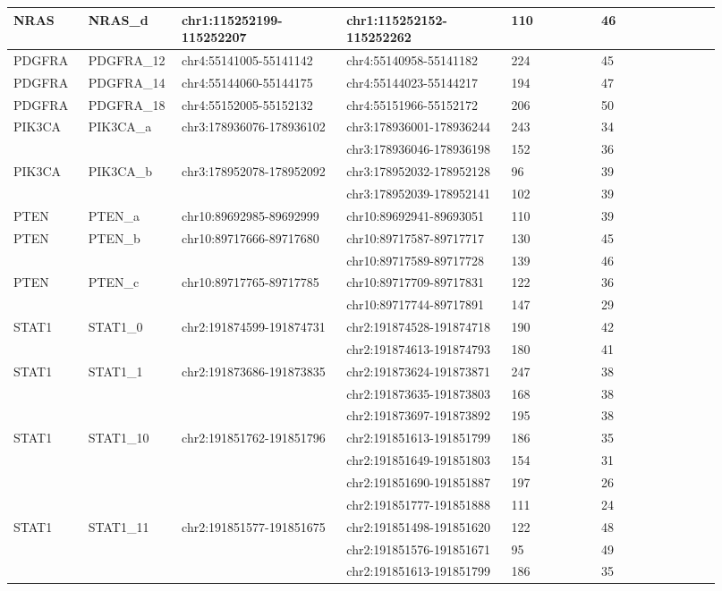 \begin{landscape}
\begin{longtable}{p{0.1\linewidth}|p{0.1\linewidth}p{0.22\linewidth}p{0.22\linewidth}p{0.12\linewidth}p{0.16\linewidth}}
NRAS & NRAS\_d & chr1:115252199-115252207 & chr1:115252152-115252262 & 110 & 46
\\
\hline
PDGFRA & PDGFRA\_12 & chr4:55141005-55141142 & chr4:55140958-55141182 & 224 & 45
\\
PDGFRA & PDGFRA\_14 & chr4:55144060-55144175 & chr4:55144023-55144217 & 194 & 47
\\
PDGFRA & PDGFRA\_18 & chr4:55152005-55152132 & chr4:55151966-55152172 & 206 & 50
\\
\hline
PIK3CA & PIK3CA\_a & chr3:178936076-178936102 & chr3:178936001-178936244 & 243 & 34
\\
 & & & chr3:178936046-178936198 & 152 & 36
\\
PIK3CA & PIK3CA\_b & chr3:178952078-178952092 & chr3:178952032-178952128 & 96 & 39
\\
 & & & chr3:178952039-178952141 & 102 & 39
\\
\hline
PTEN & PTEN\_a & chr10:89692985-89692999 & chr10:89692941-89693051 & 110 & 39
\\
PTEN & PTEN\_b & chr10:89717666-89717680 & chr10:89717587-89717717 & 130 & 45
\\
 & & & chr10:89717589-89717728 & 139 & 46
\\
PTEN & PTEN\_c & chr10:89717765-89717785 & chr10:89717709-89717831 & 122 & 36
\\
 & & & chr10:89717744-89717891 & 147 & 29
\\
\hline
STAT1 & STAT1\_0 & chr2:191874599-191874731 & chr2:191874528-191874718 & 190 & 42
\\
 & & & chr2:191874613-191874793 & 180 & 41
\\
STAT1 & STAT1\_1 & chr2:191873686-191873835 & chr2:191873624-191873871 & 247 & 38
\\
 & & & chr2:191873635-191873803 & 168 & 38
\\
 & & & chr2:191873697-191873892 & 195 & 38
\\
STAT1 & STAT1\_10 & chr2:191851762-191851796 & chr2:191851613-191851799 & 186 & 35
\\
 & & & chr2:191851649-191851803 & 154 & 31
\\
 & & & chr2:191851690-191851887 & 197 & 26
\\
 & & & chr2:191851777-191851888 & 111 & 24
\\
STAT1 & STAT1\_11 & chr2:191851577-191851675 & chr2:191851498-191851620 & 122 & 48
\\
 & & & chr2:191851576-191851671 & 95 & 49
\\
 & & & chr2:191851613-191851799 & 186 & 35

\end{longtable}
\end{landscape}
